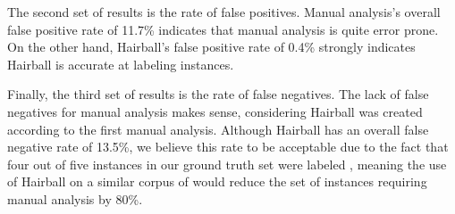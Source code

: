 The second set of results is the rate of false positives. Manual analysis's
overall false positive rate of 11.7\% indicates that manual analysis is quite
error prone. On the other hand, Hairball's false positive rate of 0.4\%
strongly indicates Hairball is accurate at labeling \correct{} instances.

Finally, the third set of results is the rate of false negatives. The lack of
false negatives for manual analysis makes sense, considering Hairball was
created according to the first manual analysis. Although Hairball has an
overall false negative rate of 13.5\%, we believe this rate to be acceptable
due to the fact that four out of five instances in our ground truth set were
labeled \correct{}, meaning the use of Hairball on a similar corpus of
 would reduce the set of instances requiring manual analysis by
80\%.
